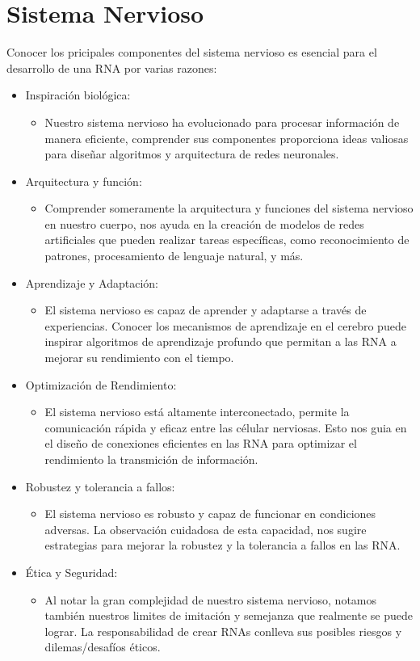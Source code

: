 \section{Sistema Nervioso}

Conocer los pricipales componentes del sistema nervioso es esencial para el desarrollo de una RNA por varias razones:
\begin{itemize}
 \item Inspiración biológica:
    \begin{itemize}
    \item Nuestro sistema nervioso ha evolucionado para procesar información de manera eficiente, comprender sus componentes proporciona ideas valiosas para diseñar algoritmos y arquitectura de redes neuronales. 
    \end{itemize}
 \item Arquitectura y función:
    \begin{itemize}
    \item Comprender someramente la arquitectura y funciones del sistema nervioso en nuestro cuerpo, nos ayuda en la creación de modelos de redes artificiales que pueden realizar tareas específicas, como reconocimiento de patrones, procesamiento de lenguaje natural, y más.
    \end{itemize} 
 \item Aprendizaje y Adaptación:
    \begin{itemize}
    \item El sistema nervioso es capaz de aprender y adaptarse a través de experiencias. Conocer los mecanismos de aprendizaje en el cerebro puede inspirar algoritmos de aprendizaje profundo que permitan a las RNA a mejorar su rendimiento con el tiempo.
    \end{itemize}
 \item Optimización de Rendimiento:
    \begin{itemize}
    \item El sistema nervioso está altamente interconectado, permite la comunicación rápida y eficaz entre las célular nerviosas. Esto nos guia en el diseño de conexiones eficientes en las RNA para optimizar el rendimiento la transmición de información.
    \end{itemize}
 \item Robustez y tolerancia a fallos:
    \begin{itemize}
    \item El sistema nervioso es robusto y capaz de funcionar en condiciones adversas. La observación cuidadosa de esta capacidad, nos sugire estrategias para mejorar la robustez y la tolerancia a fallos en las RNA.
    \end{itemize}
 \item Ética y Seguridad:
    \begin{itemize}
    \item Al notar la gran complejidad de nuestro sistema nervioso, notamos también nuestros limites de imitación y semejanza que realmente se puede lograr. La responsabilidad de crear RNAs conlleva sus posibles riesgos y dilemas/desafíos éticos. 
    \end{itemize}
\end{itemize}



